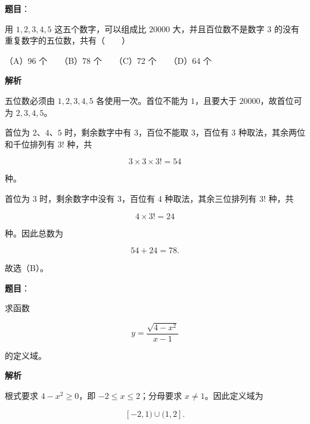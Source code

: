 \begin{answer}

\textbf{题目}：

用 $1,2,3,4,5$ 这五个数字，可以组成比 $20000$ 大，并且百位数不是数字 $3$ 的没有重复数字的五位数，共有\mbox{（　　）}

（A）96 个　　（B）78 个　　（C）72 个　　（D）64 个

\textbf{解析}

五位数必须由 $1,2,3,4,5$ 各使用一次。首位不能为 $1$，且要大于 $20000$，故首位可为 $2,3,4,5$。

首位为 $2\text{、}4\text{、}5$ 时，剩余数字中有 $3$，百位不能取 $3$，百位有 $3$ 种取法，其余两位和千位排列有 $3!$ 种，共

\nopagebreak[4]
\[
3\times3\times3!=54
\]

种。

首位为 $3$ 时，剩余数字中没有 $3$，百位有 $4$ 种取法，其余三位排列有 $3!$ 种，共

\nopagebreak[4]
\[
4\times3!=24
\]

种。因此总数为

\nopagebreak[4]
\[
54+24=78.
\]

故选（B）。


\end{answer}
\begin{answer}

\textbf{题目}：

求函数

\nopagebreak[4]
\[
y=\frac{\sqrt{4-x^2}}{x-1}
\]

的定义域。

\textbf{解析}

根式要求 $4-x^2\ge0$，即 $-2\le x\le2$；分母要求 $x\ne1$。因此定义域为

\nopagebreak[4]
\[
[-2,1)\cup(1,2].
\]


\end{answer}
